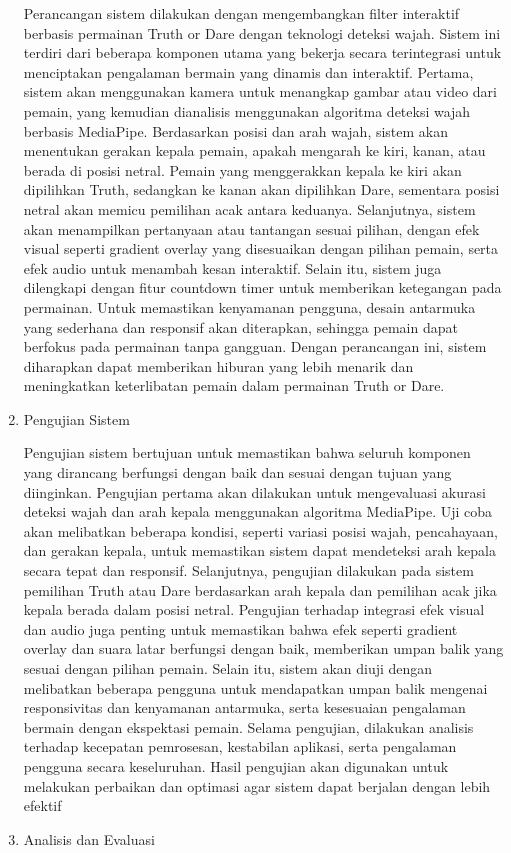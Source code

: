 \documentclass[11pt,a4paper]{article}
\begin{document}
\begin{enumerate}
    Perancangan sistem dilakukan dengan mengembangkan filter interaktif berbasis permainan Truth or Dare dengan teknologi deteksi wajah. Sistem ini terdiri dari beberapa komponen utama yang bekerja secara terintegrasi untuk menciptakan pengalaman bermain yang dinamis dan interaktif. Pertama, sistem akan menggunakan kamera untuk menangkap gambar atau video dari pemain, yang kemudian dianalisis menggunakan algoritma deteksi wajah berbasis MediaPipe. Berdasarkan posisi dan arah wajah, sistem akan menentukan gerakan kepala pemain, apakah mengarah ke kiri, kanan, atau berada di posisi netral. Pemain yang menggerakkan kepala ke kiri akan dipilihkan Truth, sedangkan ke kanan akan dipilihkan Dare, sementara posisi netral akan memicu pemilihan acak antara keduanya. Selanjutnya, sistem akan menampilkan pertanyaan atau tantangan sesuai pilihan, dengan efek visual seperti gradient overlay yang disesuaikan dengan pilihan pemain, serta efek audio untuk menambah kesan interaktif. Selain itu, sistem juga dilengkapi dengan fitur countdown timer untuk memberikan ketegangan pada permainan. Untuk memastikan kenyamanan pengguna, desain antarmuka yang sederhana dan responsif akan diterapkan, sehingga pemain dapat berfokus pada permainan tanpa gangguan. Dengan perancangan ini, sistem diharapkan dapat memberikan hiburan yang lebih menarik dan meningkatkan keterlibatan pemain dalam permainan Truth or Dare.
    \item Pengujian Sistem

    Pengujian sistem bertujuan untuk memastikan bahwa seluruh komponen yang dirancang berfungsi dengan baik dan sesuai dengan tujuan yang diinginkan. Pengujian pertama akan dilakukan untuk mengevaluasi akurasi deteksi wajah dan arah kepala menggunakan algoritma MediaPipe. Uji coba akan melibatkan beberapa kondisi, seperti variasi posisi wajah, pencahayaan, dan gerakan kepala, untuk memastikan sistem dapat mendeteksi arah kepala secara tepat dan responsif. Selanjutnya, pengujian dilakukan pada sistem pemilihan Truth atau Dare berdasarkan arah kepala dan pemilihan acak jika kepala berada dalam posisi netral. Pengujian terhadap integrasi efek visual dan audio juga penting untuk memastikan bahwa efek seperti gradient overlay dan suara latar berfungsi dengan baik, memberikan umpan balik yang sesuai dengan pilihan pemain. Selain itu, sistem akan diuji dengan melibatkan beberapa pengguna untuk mendapatkan umpan balik mengenai responsivitas dan kenyamanan antarmuka, serta kesesuaian pengalaman bermain dengan ekspektasi pemain. Selama pengujian, dilakukan analisis terhadap kecepatan pemrosesan, kestabilan aplikasi, serta pengalaman pengguna secara keseluruhan. Hasil pengujian akan digunakan untuk melakukan perbaikan dan optimasi agar sistem dapat berjalan dengan lebih efektif
    \item Analisis dan Evaluasi


\end{enumerate}
\end{document}
